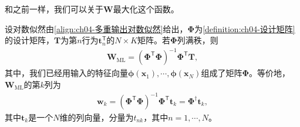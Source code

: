 \documentclass[../../main.tex]{subfiles}
\begin{document}
和之前一样，我们可以关于$\boldsymbol{W}$最大化这个函数。

\begin{proposition}[多重输出的最大似然解]\label{proposition:ch04-多重输出解}
设对数似然由\eqref{align:ch04-多重输出对数似然}给出，$\boldsymbol{\Phi}$为\cref{definition:ch04-设计矩阵}的设计矩阵，$\boldsymbol{T}$为第$n$行为$\boldsymbol{t}_n^{\mathsf{T}}$的$N\times K$矩阵。若$\boldsymbol{\Phi}$列满秩，则
\begin{align}
  \boldsymbol{W}_{\mathrm{ML}}=(\boldsymbol{\Phi}^{\mathsf{T}}\boldsymbol{\Phi})^{-1}\boldsymbol{\Phi}^{\mathsf{T}}\boldsymbol{T},
  \label{align:ch04-多重输出ML}
\end{align}
其中，我们已经用输入的特征向量$\boldsymbol{\phi}(\boldsymbol{x}_1),\cdots,\boldsymbol{\phi}(\boldsymbol{x}_N)$组成了矩阵$\boldsymbol{\Phi}$。等价地，$\boldsymbol{W}_{\mathrm{ML}}$的第$k$列为
\begin{align}
  \boldsymbol{w}_k=(\boldsymbol{\Phi}^{\mathsf{T}}\boldsymbol{\Phi})^{-1}\boldsymbol{\Phi}^{\mathsf{T}}\boldsymbol{t}_k=\boldsymbol{\Phi}^{\dagger}\boldsymbol{t}_k,
  \label{align:ch04-多重输出分量}
\end{align}
其中$\boldsymbol{t}_k$是一个$N$维的列向量，分量为$t_{nk}$，其中$n=1,\cdots,N$。
\end{proposition}
\end{document}
